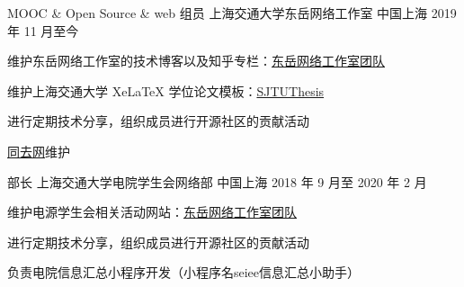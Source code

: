 

\begin{cventries}


  \cventry
    {MOOC \& Open Source \& web 组员} %
    {上海交通大学东岳网络工作室} %
    {中国上海} %
    {2019 年 11 月至今} %
    {
      \begin{cvitems}
        \item 维护东岳网络工作室的技术博客以及知乎专栏：\href{https://zhuanlan.zhihu.com/dongyue}{东岳网络工作室团队}
        \item 维护上海交通大学 XeLaTeX 学位论文模板：\href{htts://github.com/sjtug/sjtuthesis}{SJTUThesis}
        \item 进行定期技术分享，组织成员进行开源社区的贡献活动
        \item \href{https://tongqu.me}{同去网}维护
      \end{cvitems}
    }

  \cventry
    {部长} %
    {上海交通大学电院学生会网络部} %
    {中国上海} %
    {2018 年 9 月至 2020 年 2 月} %
    {
      \begin{cvitems}
        \item 维护电源学生会相关活动网站：\href{https://zhuanlan.zhihu.com/dongyue}{东岳网络工作室团队}
        \item 进行定期技术分享，组织成员进行开源社区的贡献活动
        \item 负责电院信息汇总小程序开发（小程序名seiee信息汇总小助手）
      \end{cvitems}
    }

\end{cventries}
